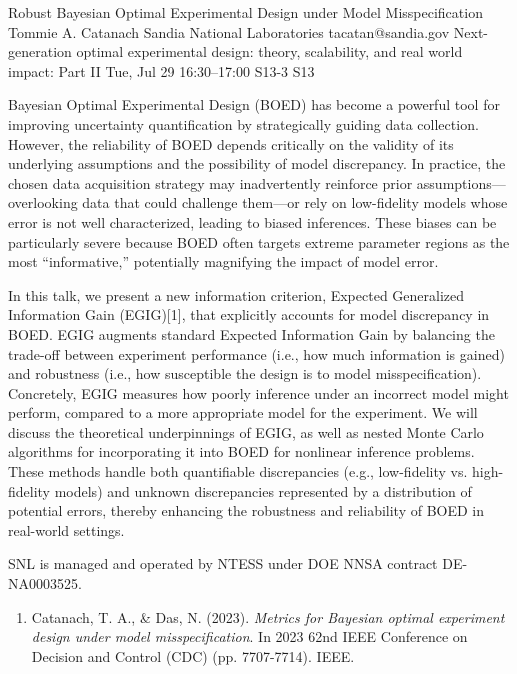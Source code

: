 \begin{talk}
  {Robust Bayesian Optimal Experimental Design under Model Misspecification}%
  {Tommie A. Catanach}%
  {Sandia National Laboratories}%
  {tacatan@sandia.gov}%
  {Next-generation optimal experimental design: theory, scalability, and real world impact: Part II}%
  {}%
  {Tue, Jul 29 16:30--17:00}%
  {S13-3}%
  {S13}%
    
   
Bayesian Optimal Experimental Design (BOED) has become a powerful tool for improving uncertainty quantification by strategically guiding data collection. However, the reliability of BOED depends critically on the validity of its underlying assumptions and the possibility of model discrepancy. In practice, the chosen data acquisition strategy may inadvertently reinforce prior assumptions—overlooking data that could challenge them—or rely on low-fidelity models whose error is not well characterized, leading to biased inferences. These biases can be particularly severe because BOED often targets extreme parameter regions as the most “informative,” potentially magnifying the impact of model error.

In this talk, we present a new information criterion, Expected Generalized Information Gain (EGIG)[1], that explicitly accounts for model discrepancy in BOED. EGIG augments standard Expected Information Gain by balancing the trade-off between experiment performance (i.e., how much information is gained) and robustness (i.e., how susceptible the design is to model misspecification). Concretely, EGIG measures how poorly inference under an incorrect model might perform, compared to a more appropriate model for the experiment. We will discuss the theoretical underpinnings of EGIG, as well as nested Monte Carlo algorithms for incorporating it into BOED for nonlinear inference problems. These methods handle both quantifiable discrepancies (e.g., low-fidelity vs. high-fidelity models) and unknown discrepancies represented by a distribution of potential errors, thereby enhancing the robustness and reliability of BOED in real-world settings.

SNL is managed and operated by NTESS under DOE NNSA contract DE-NA0003525. 
\medskip

\begin{enumerate}
 \item[{[1]}] Catanach, T. A., \& Das, N. (2023). {\it Metrics for Bayesian optimal experiment design under model misspecification}. In 2023 62nd IEEE Conference on Decision and Control (CDC) (pp. 7707-7714). IEEE.
\end{enumerate}
\end{talk}

